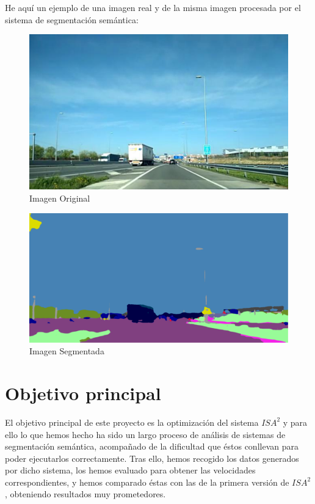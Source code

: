 He aquí un ejemplo de una imagen real y de la misma imagen procesada por el sistema de segmentación semántica:

\begin{figure}[h]
  \centering
  \includegraphics[width=12cm]{Figuras/Imagen_Original.eps}
  \caption{Imagen Original}
\end{figure}

\begin{figure}[h]
  \centering
  \includegraphics[width=12cm]{Figuras/Ejemplo_Imagen_Segmentada.eps}
  \caption{Imagen Segmentada}
\end{figure}


\section{Objetivo principal}


El objetivo principal de este proyecto es la optimización del sistema $ISA^{2}$ y para ello lo que hemos hecho ha sido un largo proceso de análisis de sistemas de segmentación semántica, acompañado de la dificultad que éstos conllevan para poder ejecutarlos correctamente. Tras ello, hemos recogido los datos generados por dicho sistema, los hemos evaluado para obtener las velocidades correspondientes, y hemos comparado éstas con las de la primera versión de $ISA^{2}$, obteniendo resultados muy prometedores.


